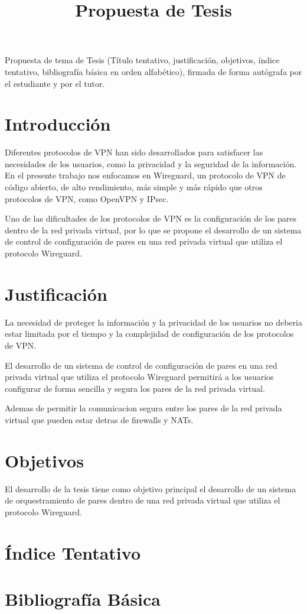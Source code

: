 \documentclass{article}
\title{Propuesta de Tesis}
\begin{document}
\maketitle

Propuesta de tema de Tesis (Título tentativo, justificación, objetivos, índice tentativo, bibliografía básica en orden alfabético), firmada de forma autógrafa por el estudiante y por el tutor.
\section{Introducción}
Diferentes protocolos de VPN han sido desarrollados para satisfacer las necesidades de los usuarios, como la privacidad y la seguridad de la información.
En el presente trabajo nos enfocamos en Wireguard, un protocolo de VPN de código abierto, de alto rendimiento, más simple y más rápido que otros protocolos de VPN, como OpenVPN y IPsec.

Uno de las dificultades de los protocolos de VPN es la configuración de los pares dentro de la red privada virtual, por lo que se propone el desarrollo de un sistema de control de configuración de pares en una red privada virtual que utiliza el protocolo Wireguard.

\section{Justificación}

La necesidad de proteger la información y la privacidad de los usuarios no deberia estar limitada por el tiempo y la complejidad de configuración de los protocolos de VPN. 

El desarrollo de un sistema de control de configuración de pares en una red privada virtual que utiliza el protocolo Wireguard permitirá a los usuarios configurar de forma sencilla y segura los pares de la red privada virtual.

Ademas de permitir la comunicacion segura entre los pares de la red privada virtual que pueden estar detras de firewalls y NATs.

\section{Objetivos}

El desarrollo de la tesis tiene como objetivo principal el desarrollo de un sistema de orquestramiento de pares dentro de una red privada virtual que utiliza el protocolo Wireguard.


\section{Índice Tentativo}

\section{Bibliografía Básica}
\end{document}
